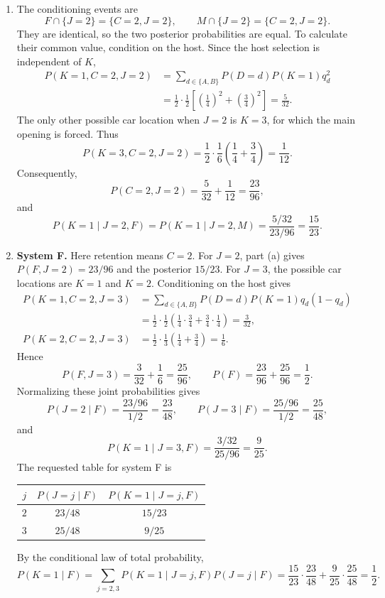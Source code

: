 \documentclass[11pt,a4paper]{article}
\newcommand{\Prob}{P}
\begin{document}
\begin{enumerate}
\item The conditioning events are
\[
F\cap\{J=2\}=\{C=2,J=2\},\qquad
M\cap\{J=2\}=\{C=2,J=2\}.
\]
They are identical, so the two posterior probabilities are equal.
To calculate their common value, condition on the host. Since the host
selection is independent of $K$,
\begin{align*}
\Prob(K=1,C=2,J=2)
&=\sum_{d\in\{A,B\}}\Prob(D=d)\Prob(K=1)q_d^2\\
&=\frac12\cdot\frac12\left[\left(\frac14\right)^2
  +\left(\frac34\right)^2\right]
=\frac5{32}.
\end{align*}
The only other possible car location when $J=2$ is $K=3$, for which the
main opening is forced. Thus
\[
\Prob(K=3,C=2,J=2)
=\frac12\cdot\frac16\left(\frac14+\frac34\right)=\frac1{12}.
\]
Consequently,
\[
\Prob(C=2,J=2)=\frac5{32}+\frac1{12}=\frac{23}{96},
\]
and
\[
\boxed{\Prob(K=1\mid J=2,F)=\Prob(K=1\mid J=2,M)
=\frac{5/32}{23/96}=\frac{15}{23}}.
\]

\item \textbf{System F.} Here retention means $C=2$. For $J=2$, part (a)
gives $\Prob(F,J=2)=23/96$ and the posterior $15/23$.
For $J=3$, the possible car locations are $K=1$ and $K=2$.
Conditioning on the host gives
\begin{align*}
\Prob(K=1,C=2,J=3)
&=\sum_{d\in\{A,B\}}\Prob(D=d)\Prob(K=1)q_d(1-q_d)\\
&=\frac12\cdot\frac12
\left(\frac14\cdot\frac34+\frac34\cdot\frac14\right)
=\frac3{32},\\
\Prob(K=2,C=2,J=3)
&=\frac12\cdot\frac13\left(\frac14+\frac34\right)=\frac16.
\end{align*}
Hence
\[
\Prob(F,J=3)=\frac3{32}+\frac16=\frac{25}{96},\qquad
\Prob(F)=\frac{23}{96}+\frac{25}{96}=\frac12.
\]
Normalizing these joint probabilities gives
\[
\Prob(J=2\mid F)=\frac{23/96}{1/2}=\frac{23}{48},\qquad
\Prob(J=3\mid F)=\frac{25/96}{1/2}=\frac{25}{48},
\]
and
\[
\Prob(K=1\mid J=3,F)=\frac{3/32}{25/96}=\frac9{25}.
\]
The requested table for system F is
\begin{center}
\begin{tabular}{ccc}
\toprule
$j$ & $\Prob(J=j\mid F)$ & $\Prob(K=1\mid J=j,F)$\\\midrule
$2$ & $23/48$ & $15/23$\\
$3$ & $25/48$ & $9/25$\\\bottomrule
\end{tabular}
\end{center}
By the conditional law of total probability,
\[
\Prob(K=1\mid F)
=\sum_{j=2,3}\Prob(K=1\mid J=j,F)\Prob(J=j\mid F)
=\frac{15}{23}\cdot\frac{23}{48}+\frac9{25}\cdot\frac{25}{48}
=\boxed{\frac12}.
\]


\end{enumerate}
\end{document}
